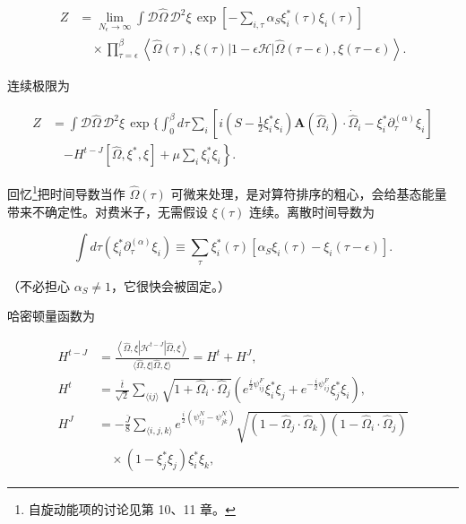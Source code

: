 \begin{align*}
Z & = \lim_{N _ {\epsilon} \to \infty} \int \mathcal {D} \hat {\Omega} \, \mathcal {D} ^ {2} \xi \, \exp \left[ - \sum_{i, \tau} \alpha_{S} \xi_{i} ^ {*} ( \tau ) \xi_{i} ( \tau ) \right]\\
& \quad \times \prod_{\tau = \epsilon} ^ {\beta} \left\langle \hat {\Omega} ( \tau ), \xi ( \tau ) \left| 1 - \epsilon \mathcal {H} \right| \hat {\Omega} ( \tau - \epsilon ), \xi ( \tau - \epsilon ) \right\rangle .
\tag{19.21}
\end{align*}

连续极限为

\begin{align*}
Z & = \int \mathcal {D} \hat {\Omega} \, \mathcal {D} ^ {2} \xi \, \exp \Big\{ \int_ {0} ^ {\beta} d \tau \sum_ {i} \left[ i \left( S - \frac {1}{2} \xi_{i} ^ {*} \xi_{i} \right) \mathbf {A} ( \hat {\Omega} _ {i} ) \cdot \dot {\hat {\Omega}} _ {i} - \xi_{i} ^ {*} \partial_ {\tau}^{(\alpha)} \xi_{i} \right]\\
& \quad \left. - H ^ {t - J} [ \hat {\Omega}, \xi ^ {*}, \xi ] + \mu \sum_ {i} \xi_{i} ^ {*} \xi_{i} \right\} .
\tag{19.22}
\end{align*}

回忆\footnote{自旋动能项的讨论见第 10、11 章。}把时间导数当作 $\hat{\Omega}(\tau)$ 可微来处理，是对算符排序的粗心，会给基态能量带来不确定性。对费米子，无需假设 $\xi(\tau)$ 连续。离散时间导数为

\begin{equation*}
\int d \tau \left( \xi_{i} ^ {*} \partial_ {\tau}^{(\alpha)} \xi_{i} \right) \equiv \sum_ {\tau} \xi_{i} ^ {*} ( \tau ) \left[ \alpha_{S} \xi_{i} ( \tau ) - \xi_{i} ( \tau - \epsilon ) \right].
\tag{19.23}
\end{equation*}

（不必担心 $\alpha_{S} \neq 1$，它很快会被固定。）

哈密顿量函数为

\begin{align*}
H ^ {t - J} & = \frac {\left\langle \hat {\Omega}, \xi \left| \mathcal {H} ^ {t - J} \right| \hat {\Omega}, \xi \right\rangle}{\langle \hat {\Omega}, \xi | \hat {\Omega}, \xi \rangle} = H ^ {t} + H ^ {J} ,\\
H ^ {t} & = \frac {\bar {t}}{\sqrt {2}} \sum_{\langle ij \rangle} \sqrt {1 + \hat {\Omega} _ {i} \cdot \hat {\Omega} _ {j}} \left( e ^ {\frac {i}{2} \psi_{ij} ^ {F}} \xi_{i} ^ {*} \xi_{j} + e ^ {- \frac {i}{2} \psi_{ij} ^ {F}} \xi_{j} ^ {*} \xi_{i} \right) ,\\
H ^ {J} & = - \frac {\bar {J}}{8} \sum_{\langle i, j, k \rangle} e ^ {\frac {i}{2} ( \psi_{ij} ^ {N} - \psi_{jk} ^ {N} )} \sqrt { \left( 1 - \hat {\Omega} _ {j} \cdot \hat {\Omega} _ {k} \right) \left( 1 - \hat {\Omega} _ {i} \cdot \hat {\Omega} _ {j} \right) }\\
& \quad \times \left( 1 - \xi_{j} ^ {*} \xi_{j} \right) \xi_{i} ^ {*} \xi_{k} ,
\tag{19.24}
\end{align*}

